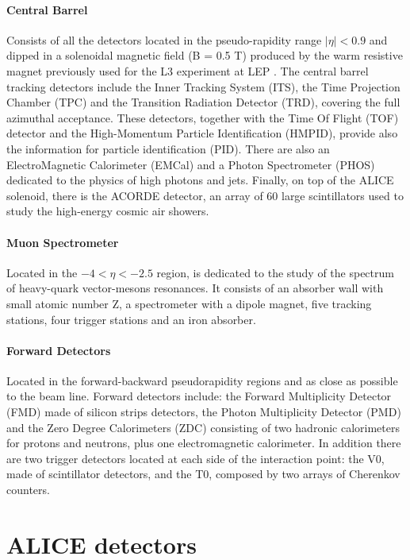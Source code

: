 \paragraph{Central Barrel}
Consists of all the detectors located in the pseudo-rapidity range $|\eta| < 0.9$ and dipped in a 
solenoidal magnetic field (B = 0.5 T) produced by the warm resistive magnet previously used for
the L3 experiment at LEP \cite{lep}.
The central barrel  tracking detectors include the Inner Tracking System (ITS), the Time Projection 
Chamber (TPC) and the Transition Radiation Detector (TRD), covering the full azimuthal acceptance.
These detectors, together with the Time Of Flight (TOF) detector and the High-Momentum 
Particle Identification (HMPID), provide also the information for particle identification (PID).
There are also an ElectroMagnetic Calorimeter (EMCal) and a Photon Spectrometer (PHOS) dedicated to the
physics of high \pt photons and jets.
Finally, on top of the ALICE solenoid, there is the ACORDE detector, an array of 60 large scintillators
used to study the high-energy cosmic air showers.

\paragraph{Muon Spectrometer} 
Located in the $-4 < \eta < -2.5$ region, is dedicated to the study of the spectrum of 
heavy-quark vector-mesons resonances.
It consists of an absorber wall with small atomic number Z, a spectrometer with a dipole magnet,
five tracking stations, four trigger stations and an iron absorber.

\paragraph{Forward Detectors}
Located in the forward-backward pseudorapidity regions and as close as possible to the beam line.
Forward detectors include: the Forward Multiplicity Detector (FMD) made of silicon strips detectors, the Photon
Multiplicity Detector (PMD) and the Zero Degree Calorimeters (ZDC) consisting of two hadronic 
calorimeters for protons and neutrons, plus one electromagnetic calorimeter. 
In addition there are two trigger detectors located at each side of the interaction point:
the V0, made of scintillator detectors, and the T0, composed by two arrays of Cherenkov counters.

%
%
\section{ALICE detectors} \label{sec:alice_detectors}

